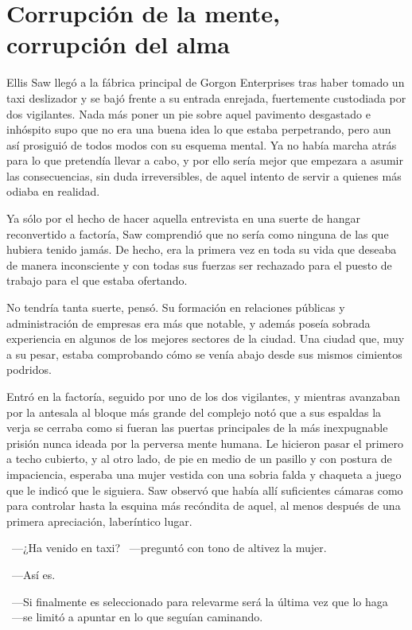 \section*{Corrupción de la mente, corrupción del alma}

Ellis Saw llegó a la fábrica principal de Gorgon Enterprises tras haber tomado un taxi deslizador y se bajó frente a su entrada enrejada, fuertemente custodiada por dos vigilantes. Nada más poner un pie sobre aquel pavimento desgastado e inhóspito supo que no era una buena idea lo que estaba perpetrando, pero aun así prosiguió de todos modos con su esquema mental. Ya no había marcha atrás para lo que pretendía llevar a cabo, y por ello sería mejor que empezara a asumir las consecuencias, sin duda irreversibles, de aquel intento de servir a quienes más odiaba en realidad.

Ya sólo por el hecho de hacer aquella entrevista en una suerte de hangar reconvertido a factoría, Saw comprendió que no sería como ninguna de las que hubiera tenido jamás. De hecho, era la primera vez en toda su vida que deseaba de manera inconsciente y con todas sus fuerzas ser rechazado para el puesto de trabajo para el que estaba ofertando.

No tendría tanta suerte, pensó. Su formación en relaciones públicas y administración de empresas era más que notable, y además poseía sobrada experiencia en algunos de los mejores sectores de la ciudad. Una ciudad que, muy a su pesar, estaba comprobando cómo se venía abajo desde sus mismos cimientos podridos.

Entró en la factoría, seguido por uno de los dos vigilantes, y mientras avanzaban por la antesala al bloque más grande del complejo notó que a sus espaldas la verja se cerraba como si fueran las puertas principales de la más inexpugnable prisión nunca ideada por la perversa mente humana. Le hicieron pasar el primero a techo cubierto, y al otro lado, de pie en medio de un pasillo y con postura de impaciencia, esperaba una mujer vestida con una sobria falda y chaqueta a juego que le indicó que le siguiera. Saw observó que había allí suficientes cámaras como para controlar hasta la esquina más recóndita de aquel, al menos después de una primera apreciación, laberíntico lugar.

~---¿Ha venido en taxi? ~---preguntó con tono de altivez la mujer.

~---Así es.

~---Si finalmente es seleccionado para relevarme será la última vez que lo haga ~---se limitó a apuntar en lo que seguían caminando.

